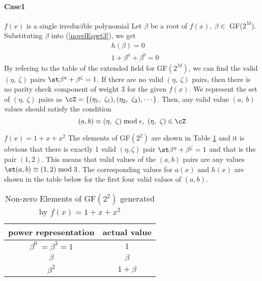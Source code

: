 \paragraph{ Case1} $f(x)$ is a single irreducible polynomial \newline
Let $\beta$  be a root of $f(x),~\beta \in $ GF($2^M$). Substituting $\beta$ into (\ref{novelEqwt3}), we get 
\begin{equation}
\begin{split}
&h(\beta)=0\\
&1+\beta^a+\beta^b=0
\end{split}
\label{novelEqwt3-1}
\end{equation}
By refering to the table of the extended field for GF$(2^M)$, we can find the valid $(\eta,~\zeta)$ pairs $\st \beta^{\eta}+\beta^{\zeta}=1$. If there are no valid $(\eta,~\zeta)$ pairs, then there is no parity check component of weight $3$ for the given $f(x)$.
 We represent the set of $(\eta,~\zeta)$ pairs as 
$\cZ=\{ (\eta_1,~\zeta_1) ,( \eta_2,~\zeta_2),\cdots\}$. Then, any valid value $(a,~b)$ values should satisfy the condition
\begin{equation}
(a,b) \equiv (\eta,~\zeta) \bmod \epsilon,~(\eta,~\zeta)\in \cZ
\end{equation}
\begin{example}
$f(x)=1+x+x^2$ \newline
The elements of GF$(2^2)$ are shown in Table \ref{novelTab7} and it is obvious that there is exactly 1 valid $(\eta,\zeta)$ pair $\st \beta^{\eta}+\beta^{\zeta} = 1$ and that is the pair $(1,2)$.
This means that valid values of the $(a,b)$ pairs are any values $\st (a,b) \equiv (1,2) \bmod 3$.  The corresponding values for $a(x)$ and $h(x)$ are shown in the table below for the first four valid values of $(a,b)$.
\label{ex-5}
\end{example}

 \begin{table}[htbp]
 \caption{Non-zero Elements of GF$(2^2)$ generated by $f(x)=1+x+x^2$}
\centering
 \begin{tabular}{c c} 
 \hline
 power representation & actual value \\ [0.5ex] 
 \hline\hline
$\beta^0~=\beta^3=1$ & $1$\\
\hline
$\beta$ & $\beta$\\
\hline
$\beta^2$ &  $1+\beta$\\
\hline
 \end{tabular}
 \label{novelTab7}
\end{table}

